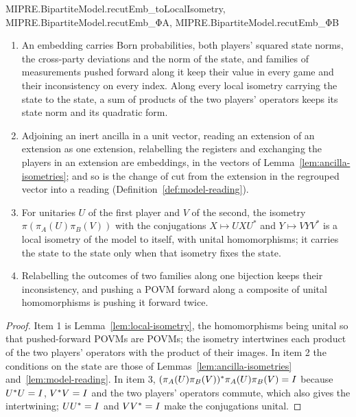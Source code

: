 \begin{lemma}[Embeddings]
{  MIPRE.BipartiteModel.recutEmb_toLocalIsometry, MIPRE.BipartiteModel.recutEmb_ΦA,
  MIPRE.BipartiteModel.recutEmb_ΦB}
\leanok
\begin{enumerate}
  \item An embedding carries Born probabilities, both players' squared state norms, the cross-party
    deviations and the norm of the state, and families of measurements pushed forward along it keep
    their value in every game and their inconsistency on every index. Along every local isometry
    carrying the state to the state, a sum of products of the two players' operators keeps its state
    norm and its quadratic form.
  \item Adjoining an inert ancilla in a unit vector, reading an extension of an extension as one
    extension, relabelling the registers and exchanging the players in an extension are embeddings,
    in the vectors of Lemma~\ref{lem:ancilla-isometries}; and so is the change of cut from the
    extension in the regrouped vector into a reading (Definition~\ref{def:model-reading}).
  \item For unitaries $U$ of the first player and $V$ of the second, the isometry
    $\pi(\pi_A(U)\pi_B(V))$ with the conjugations $X \mapsto U X U^*$ and $Y \mapsto V Y V^*$ is a
    local isometry of the model to itself, with unital homomorphisms; it carries the state to the
    state only when that isometry fixes the state.
  \item Relabelling the outcomes of two families along one bijection keeps their inconsistency, and
    pushing a POVM forward along a composite of unital homomorphisms is pushing it forward twice.
\end{enumerate}
\end{lemma}

\begin{proof}
\leanok
Item 1 is Lemma~\ref{lem:local-isometry}, the homomorphisms being unital so that pushed-forward
POVMs are POVMs; the isometry intertwines each product of the two players' operators with the
product of their images. In item 2 the conditions on the state are those of
Lemmas~\ref{lem:ancilla-isometries} and~\ref{lem:model-reading}. In item 3,
$(\pi_A(U)\pi_B(V))^*\pi_A(U)\pi_B(V) = I$ because $U^*U = I$, $V^*V = I$ and the two players'
operators commute, which also gives the intertwining; $UU^* = I$ and $VV^* = I$ make the
conjugations unital.
\end{proof}

